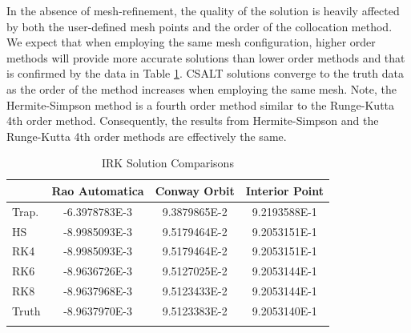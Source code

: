 \documentclass[ISTS  ]{tjsass} %
\newcommand{\bhline}[1]{\noalign{\hrule height #1}}
\begin{document}
In the absence of mesh-refinement, the quality of the solution is heavily affected by both the user-defined mesh points and the order of the collocation method. We expect that when employing the same mesh configuration, higher order methods will provide more accurate solutions than lower order methods and that is confirmed by the data in Table \ref{table:irk_comparison}.  CSALT solutions converge to the truth data as the order of the method increases when employing the same mesh. Note, the Hermite-Simpson method is a fourth order method similar to the Runge-Kutta 4th order method. Consequently, the results from Hermite-Simpson and the Runge-Kutta 4th order methods are effectively the same.
%
\begin{table}
    \centering
    \caption{IRK Solution Comparisons}
    \label{table:irk_comparison}
    \begin{tabularx}{\columnwidth}{Xccc}\bhline{.8pt}
                        & \textbf{Rao Automatica} & \textbf{Conway Orbit} & \textbf{Interior Point}\\\hline
        Trap.           & -6.3978783E-3           & 9.3879865E-2          & 9.2193588E-1\\
        HS              & -8.9985093E-3           & 9.5179464E-2          & 9.2053151E-1\\
        RK4             & -8.9985093E-3           & 9.5179464E-2          & 9.2053151E-1\\
        RK6             & -8.9636726E-3           & 9.5127025E-2          & 9.2053144E-1\\
        RK8             & -8.9637968E-3           & 9.5123433E-2          & 9.2053144E-1\\
        Truth           & -8.9637970E-3           & 9.5123383E-2          & 9.2053140E-1\\\bhline{.8pt}
    \end{tabularx}
\end{table}
\end{document}
